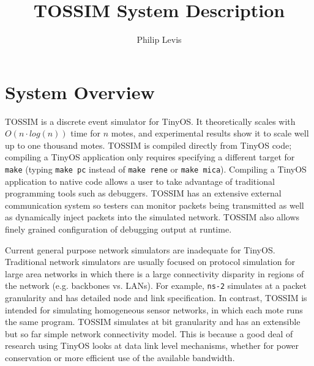 \documentclass[12pt]{article}
\begin{document}
\fontsize{10}{10}                               %

\title{TOSSIM System Description}
\author{Philip Levis}
\maketitle

\fontsize{10}{10}                               %

\section*{System Overview}

TOSSIM is a discrete event simulator for TinyOS. It theoretically
scales with $O(n \cdot log(n))$ time for $n$ motes, and experimental
results show it to scale well up to one thousand motes. TOSSIM is
compiled directly from TinyOS code; compiling a TinyOS application
only requires specifying a different target for {\tt make} (typing
{\tt make pc} instead of {\tt make rene} or {\tt make
mica}). Compiling a TinyOS application to native code allows a user to
take advantage of traditional programming tools such as
debuggers. TOSSIM has an extensive external communication system so
testers can monitor packets being transmitted as well as dynamically
inject packets into the simulated network. TOSSIM also allows finely
grained configuration of debugging output at runtime.

Current general purpose network simulators are inadequate for
TinyOS. Traditional network simulators are usually focused on protocol
simulation for large area networks in which there is a large
connectivity disparity in regions of the network (e.g. backbones
vs. LANs). For example, {\tt ns-2} simulates at a packet
granularity and has detailed node and link specification. In contrast,
TOSSIM is intended for simulating homogeneous sensor networks, in
which each mote runs the same program. TOSSIM simulates at bit
granularity and has an extensible but so far simple network
connectivity model. This is because a good deal of research using
TinyOS looks at data link level mechanisms, whether for power
conservation or more efficient use of the available
bandwidth.
\end{document}
